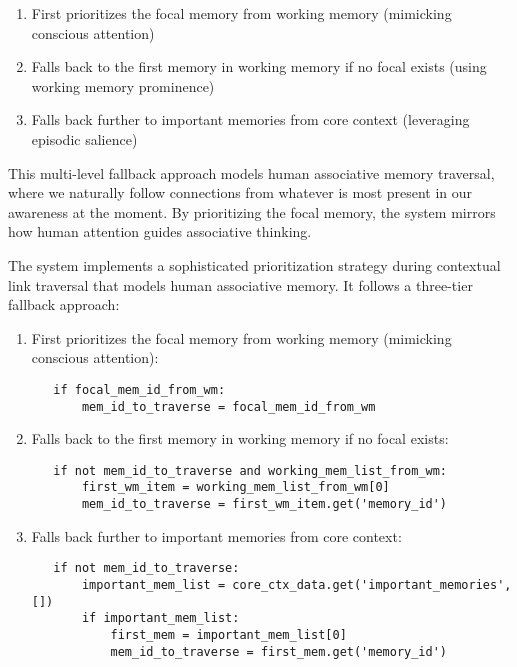 \documentclass[12pt,a4paper]{article}
\begin{document}
\begin{enumerate}[label=\arabic*.]
    \item First prioritizes the focal memory from working memory (mimicking conscious attention)
    \item Falls back to the first memory in working memory if no focal exists (using working memory prominence)
    \item Falls back further to important memories from core context (leveraging episodic salience)
\end{enumerate}

This multi-level fallback approach models human associative memory traversal, where we naturally follow connections from whatever is most present in our awareness at the moment. By prioritizing the focal memory, the system mirrors how human attention guides associative thinking.

The system implements a sophisticated prioritization strategy during contextual link traversal that models human associative memory. It follows a three-tier fallback approach:

\begin{enumerate}[label=\arabic*.]
    \item First prioritizes the focal memory from working memory (mimicking conscious attention):
    \begin{pageablecode}
    \begin{verbatim}
   if focal_mem_id_from_wm:
       mem_id_to_traverse = focal_mem_id_from_wm
    \end{verbatim}
    \end{pageablecode}

    \item Falls back to the first memory in working memory if no focal exists:
    \begin{pageablecode}
    \begin{verbatim}
   if not mem_id_to_traverse and working_mem_list_from_wm:
       first_wm_item = working_mem_list_from_wm[0]
       mem_id_to_traverse = first_wm_item.get('memory_id')
    \end{verbatim}
    \end{pageablecode}

    \item Falls back further to important memories from core context:
    \begin{pageablecode}
    \begin{verbatim}
   if not mem_id_to_traverse:
       important_mem_list = core_ctx_data.get('important_memories', [])
       if important_mem_list:
           first_mem = important_mem_list[0]
           mem_id_to_traverse = first_mem.get('memory_id')
    \end{verbatim}
    \end{pageablecode}
\end{enumerate}
\end{document}
